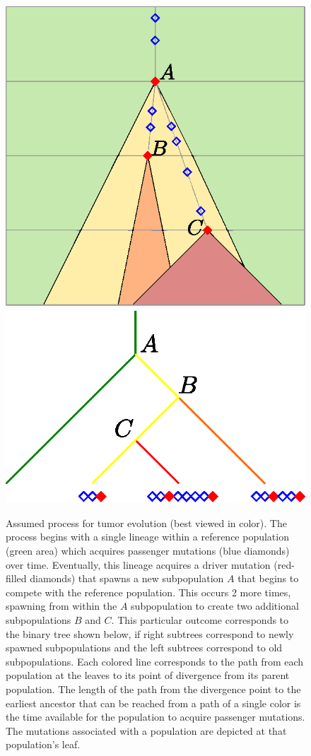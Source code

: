 \documentclass{bioinfo}
\begin{document}
\begin{methods}
\begin{figure}
\centering
\includegraphics[width=0.9\columnwidth]{../figures/tumor_subclonal_growth_A.eps}
\includegraphics[width=0.9\columnwidth]{../figures/tumor_subclonal_growth_B.eps}
\caption{Assumed process for tumor evolution (best viewed in color).  The process begins with a single lineage within a reference population (green area) which acquires passenger mutations (blue diamonds) over time.  Eventually, this lineage acquires a driver mutation (red-filled diamonds) that spawns a new subpopulation $A$ that begins to compete with the reference population.  This occurs 2 more times, spawning from within the $A$ subpopulation to create two additional subpopulations $B$ and $C$.  This particular outcome corresponds to the binary tree shown below, if right subtrees correspond to newly spawned subpopulations and the left subtrees correspond to old subpopulations.  Each colored line corresponds to the path from each population at the leaves to its point of divergence from its parent population.  The length of the path from the divergence point to the earliest ancestor that can be reached from a path of a single color is the time available for the population to acquire passenger mutations.  The mutations associated with a population are depicted at that population's leaf.}
\label{fig:tumor_evolution}
\end{figure}


\end{methods}
\end{document}
